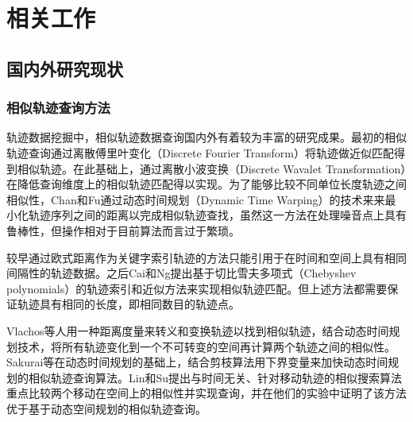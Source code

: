 
\chapter{相关工作}
\label{chap:related}


\section{国内外研究现状}
\label{sec:situation}

\subsection{相似轨迹查询方法}
\label{subsec:situation-methods}
轨迹数据挖掘中，相似轨迹数据查询国内外有着较为丰富的研究成果。最初的相似轨迹查询通过离散傅里叶变化（Discrete Fourier Transform）将轨迹做近似匹配得到相似轨迹\cite{agrawal1993efficient}。在此基础上，通过离散小波变换（Discrete Wavalet Transformation）在降低查询维度上的相似轨迹匹配得以实现\cite{chan1999efficient}。为了能够比较不同单位长度轨迹之间相似性，Chan和Fu通过动态时间规划（Dynamic Time Warping）的技术来来最小化轨迹序列之间的距离以完成相似轨迹查找\cite{bernad1996finding}，虽然这一方法在处理噪音点上具有鲁棒性，但操作相对于目前算法而言过于繁琐。

较早通过欧式距离作为关键字索引轨迹的方法\cite{yanagisawa2003shape}只能引用于在时间和空间上具有相同间隔性的轨迹数据。之后Cai和Ng提出基于切比雪夫多项式（Chebyshev polynomials）的轨迹索引和近似方法来实现相似轨迹匹配\cite{cai2004indexing}。但上述方法都需要保证轨迹具有相同的长度，即相同数目的轨迹点。

Vlachos等人用一种距离度量来转义和变换轨迹以找到相似轨迹\cite{vlachos2004rotation}，结合动态时间规划技术，将所有轨迹变化到一个不可转变的空间再计算两个轨迹之间的相似性。Sakurai等在动态时间规划的基础上，结合剪枝算法用下界变量来加快动态时间规划的相似轨迹查询算法\cite{sakurai2005ftw}。Lin和Su提出与时间无关、针对移动轨迹的相似搜索算法重点比较两个移动在空间上的相似性并实现查询，并在他们的实验中证明了该方法优于基于动态空间规划的相似轨迹查询。

